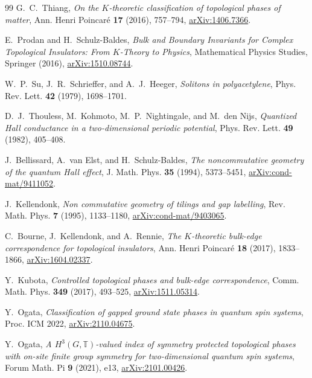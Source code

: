 \documentclass[12pt]{article}
\theoremstyle{plain}
\begin{document}
\begin{thebibliography}{99}
G.~C.~Thiang,
\emph{On the $K$-theoretic classification of topological phases of matter},
Ann. Henri Poincar\'e \textbf{17} (2016), 757--794, \href{https://arxiv.org/abs/1406.7366}{arXiv:1406.7366}.

E.~Prodan and H.~Schulz-Baldes,
\emph{Bulk and Boundary Invariants for Complex Topological Insulators: From
$K$-Theory to Physics},
Mathematical Physics Studies, Springer (2016), \href{https://arxiv.org/abs/1510.08744}{arXiv:1510.08744}.

W.~P.~Su, J.~R.~Schrieffer, and A.~J.~Heeger,
\emph{Solitons in polyacetylene},
Phys. Rev. Lett. \textbf{42} (1979), 1698--1701.

D.~J.~Thouless, M.~Kohmoto, M.~P.~Nightingale, and M.~den Nijs,
\emph{Quantized Hall conductance in a two-dimensional periodic potential},
Phys. Rev. Lett. \textbf{49} (1982), 405--408.

J.~Bellissard, A.~van Elst, and H.~Schulz-Baldes,
\emph{The noncommutative geometry of the quantum Hall effect},
J. Math. Phys. \textbf{35} (1994), 5373--5451, \href{https://arxiv.org/abs/cond-mat/9411052}{arXiv:cond-mat/9411052}.

J.~Kellendonk,
\emph{Non commutative geometry of tilings and gap labelling},
Rev. Math. Phys. \textbf{7} (1995), 1133--1180, \href{https://arxiv.org/abs/cond-mat/9403065}{arXiv:cond-mat/9403065}.

C.~Bourne, J.~Kellendonk, and A.~Rennie,
\emph{The $K$-theoretic bulk-edge correspondence for topological insulators},
Ann. Henri Poincar\'e \textbf{18} (2017), 1833--1866, \href{https://arxiv.org/abs/1604.02337}{arXiv:1604.02337}.

Y.~Kubota,
\emph{Controlled topological phases and bulk-edge correspondence},
Comm. Math. Phys. \textbf{349} (2017), 493--525, \href{https://arxiv.org/abs/1511.05314}{arXiv:1511.05314}.

Y.~Ogata,
\emph{Classification of gapped ground state phases in quantum spin systems},
Proc. ICM 2022, \href{https://arxiv.org/abs/2110.04675}{arXiv:2110.04675}.

Y.~Ogata,
\emph{A $H^{3}(G,\mathbb{T})$-valued index of symmetry protected topological phases
with on-site finite group symmetry for two-dimensional quantum spin systems},
Forum Math. Pi \textbf{9} (2021), e13, \href{https://arxiv.org/abs/2101.00426}{arXiv:2101.00426}.


\end{thebibliography}
\end{document}
